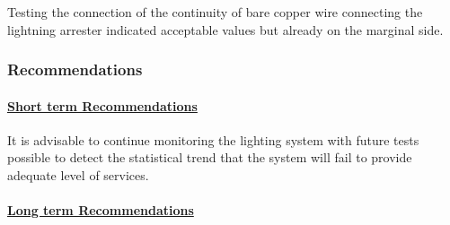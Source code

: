 

Testing the connection of the continuity of bare copper wire connecting the lightning arrester indicated acceptable values but already on the marginal side. 




\subsubsection{Recommendations}

\paragraph{\underline{Short term Recommendations}}

It is advisable to continue monitoring the lighting system with future tests possible to detect the statistical trend that the system will fail to provide adequate level of services.


\paragraph{\underline{Long term Recommendations}}

